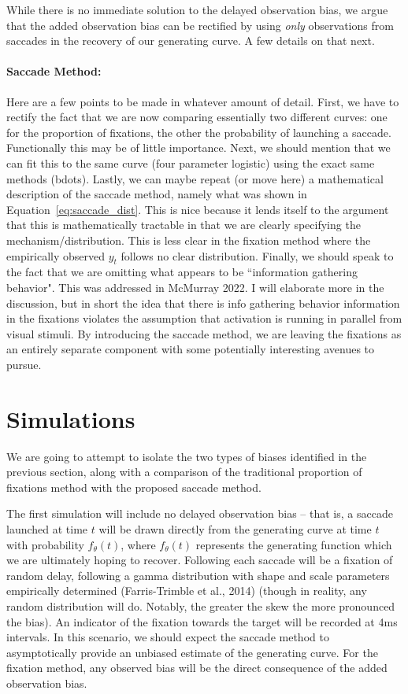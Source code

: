 \documentclass{article}
\begin{document}
While there is no immediate solution to the delayed observation bias, we argue that the added observation bias can be rectified by using \textit{only} observations from saccades in the recovery of our generating curve. A few details on that next. 

\paragraph{Saccade Method:} Here are a few points to be made in whatever amount of detail. First, we have to rectify the fact that we are now comparing essentially two different curves: one for the proportion of fixations, the other the probability of launching a saccade. Functionally this may be of little importance. Next, we should mention that we can fit this to the same curve (four parameter logistic) using the exact same methods (bdots). Lastly, we can maybe repeat (or move here) a mathematical description of the saccade method, namely what was shown in Equation~\ref{eq:saccade_dist}. This is nice because it lends itself to the argument that this is mathematically tractable in that we are clearly specifying the mechanism/distribution. This is less clear in the fixation method where the empirically observed $y_t$ follows no clear distribution. Finally, we should speak to the fact that we are omitting what appears to be ``information gathering behavior". This was addressed in McMurray 2022. I will elaborate more in the discussion, but in short the idea that there is info gathering behavior information in the fixations violates the assumption that activation is running in parallel from visual stimuli. By introducing the saccade method, we are leaving the fixations as an entirely separate component with some potentially interesting avenues to pursue.

\section{Simulations}
 
We are going to attempt to isolate the two types of biases identified in the previous section, along with a comparison of the traditional proportion of fixations method with the proposed saccade method.

The first simulation will include no delayed observation bias -- that is, a saccade launched at time $t$ will be drawn directly from the generating curve at time $t$ with probability $f_{\theta}(t)$, where $f_{\theta}(t)$ represents the generating function which we are ultimately hoping to recover. Following each saccade will be a fixation of random delay, following a gamma distribution with shape and scale parameters empirically determined (Farris-Trimble et al., 2014) (though in reality, any random distribution will do. Notably, the greater the skew the more pronounced the bias). An indicator of the fixation towards the target will be recorded at 4ms intervals. In this scenario, we should expect the saccade method to asymptotically provide an unbiased estimate of the generating curve. For the fixation method, any observed bias will be the direct consequence of the added observation bias.
\end{document}
